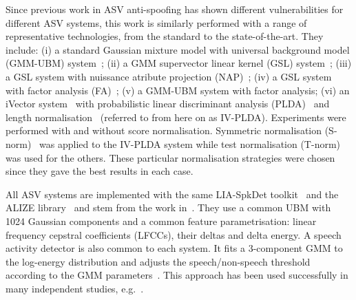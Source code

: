 
Since previous work in ASV anti-spoofing has shown different vulnerabilities for different ASV systems, this work is similarly performed with a range of representative technologies, from the standard to the state-of-the-art.
They include: 
(i) a standard Gaussian mixture model with universal background model (GMM-UBM) system~\cite{THE Reynolds paper};
(ii) a GMM supervector linear kernel (GSL) system~\cite{a suitable reference};
(iii) a GSL system with nuissance atribute projection (NAP)~\cite{Campbell2006};
(iv) a GSL system with factor analysis (FA)~\cite{Fauve2007};
(v) a GMM-UBM system with factor analysis;
(vi) an iVector system~\cite{Dehak2011} with probabilistic linear discriminant analysis (PLDA)~\cite{Li2012} and length normalisation~\cite{Garcia2011} (referred to from here on as IV-PLDA). 
Experiments were performed with and without score normalisation.  
Symmetric normalisation (S-norm)~\cite{Kenny2010} was applied to the IV-PLDA system while test normalisation (T-norm)~\cite{Auckenthaler2000} was used for the others.  These particular normalisation strategies were chosen since they gave the best results in each case. 

All ASV systems are implemented with the same LIA-SpkDet toolkit~\cite{Bonastre2008} and the ALIZE library~\cite{Bonastre2004} and stem from the work in~\cite{Fauve2007}.
They use a common UBM with 1024 Gaussian components and a common feature parametrisation: linear frequency cepstral coefficients (LFCCs), their deltas and delta energy. 
A speech activity detector is also common to each system.  
It fits a 3-component GMM to the log-energy distribution and adjusts the speech/non-speech threshold according to the GMM parameters~\cite{Bimbot2004}.
This approach has been used successfully in many independent studies, e.g.~\cite{fauve2008}. 
